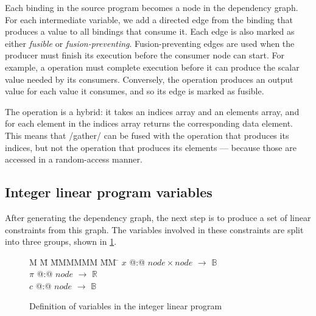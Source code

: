 

Each binding in the source program becomes a node in the dependency graph.
For each intermediate variable, we add a directed edge from the binding that produces a value to all bindings that consume it.
Each edge is also marked as either \emph{fusible} or \emph{fusion-preventing}.
Fusion-preventing edges are used when the producer must finish its execution before the consumer node can start.
For example, a \Hs@fold@ operation must complete execution before it can produce the scalar value needed by its consumers.
Conversely, the \Hs@map@ operation produces an output value for each value it consumes, and so its edge is marked as fusible. 

The \Hs@gather@ operation is a hybrid: it takes an indices array and an elements array, and for each element in the indices array returns the corresponding data element.
This means that \Hs/gather/ can be fused with the operation that produces its indices, but not the operation that produces its elements --- because those are accessed in a random-access manner. 




\subsection{Integer linear program variables}
After generating the dependency graph, the next step is to produce a set of linear constraints from this graph.
The variables involved in these constraints are split into three groups, shown in \cref{fig:clustering:ilp-vars}.

\begin{figure}
\centering
\parbox{0cm}{
\begin{tabbing}
M   \= M \= MMMMMM \= MM \= \kill
$x$   \> @:@  \> $node \times node$ \> $\to$ \> $\mathbb{B}$ \\
$\pi$ \> @:@  \> $node$             \> $\to$ \> $\mathbb{R}$ \\
$c$   \> @:@  \> $node$             \> $\to$ \> $\mathbb{B}$
\end{tabbing}
}
\caption{Definition of variables in the integer linear program}
\label{fig:clustering:ilp-vars}
\end{figure}

